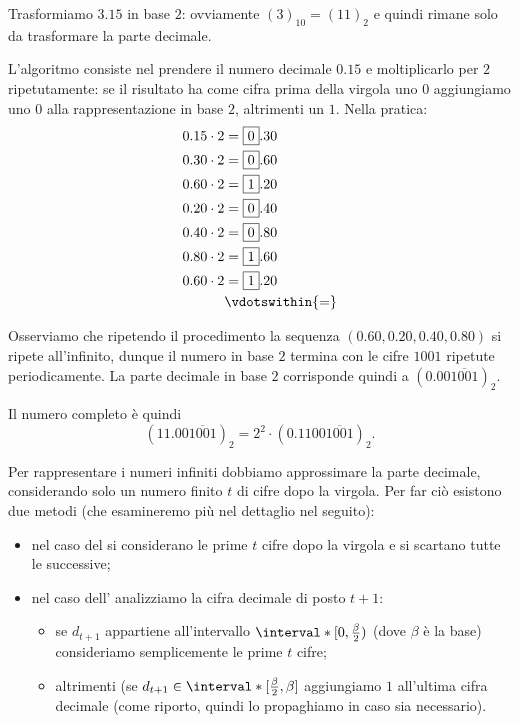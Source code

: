 \begin{example}
    Trasformiamo $3.15$ in base $2$: ovviamente $(3)_{10} = (11)_2$ e quindi rimane solo da trasformare la parte decimale. 
    
    L'algoritmo consiste nel prendere il numero decimale $0.15$ e moltiplicarlo per $2$ ripetutamente: se il risultato ha come cifra prima della virgola uno $0$ aggiungiamo uno $0$ alla rappresentazione in base $2$, altrimenti un $1$. Nella pratica:
    \begin{align*}
        0.15 \cdot 2 &= \boxed{0}.30 \\
        0.30 \cdot 2 &= \boxed{0}.60 \\
        0.60 \cdot 2 &= \boxed{1}.20 \\
        0.20 \cdot 2 &= \boxed{0}.40 \\
        0.40 \cdot 2 &= \boxed{0}.80 \\
        0.80 \cdot 2 &= \boxed{1}.60 \\
        0.60 \cdot 2 &= \boxed{1}.20 \\
        &\vdotswithin{=} 
    \end{align*} 

    Osserviamo che ripetendo il procedimento la sequenza $(0.60, 0.20, 0.40, 0.80)$ si ripete all'infinito, dunque il numero in base $2$ termina con le cifre $1001$ ripetute periodicamente. La parte decimale in base $2$ corrisponde quindi a $(0.00\overline{1001})_2$.

    Il numero completo è quindi \[
        (11.00\overline{1001})_2 = 2^2 \cdot (0.1100\overline{1001})_2.
    \]
\end{example}

Per rappresentare i numeri infiniti dobbiamo approssimare la parte decimale, considerando solo un numero finito $t$ di cifre dopo la virgola. Per far ciò esistono due metodi (che esamineremo più nel dettaglio nel seguito):
\begin{itemize}
    \item nel caso del  si considerano le prime $t$ cifre dopo la virgola e si scartano tutte le successive;
    \item nel caso dell' analizziamo la cifra decimale di posto $t+1$: \begin{itemize}
        \item se $d_{t+1}$ appartiene all'intervallo $\interval*[{0, \frac{\beta}{2}})$ (dove $\beta$ è la base) consideriamo semplicemente le prime $t$ cifre;
        \item altrimenti (se $d_{t+1} \in \interval*[{\frac{\beta}{2}, \beta}]$ aggiungiamo $1$ all'ultima cifra decimale (come riporto, quindi lo propaghiamo in caso sia necessario).
    \end{itemize}
\end{itemize}


